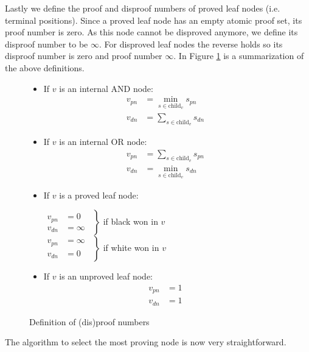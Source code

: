\documentclass[a4paper, 11pt]{article}
\begin{document}
Lastly we define the proof and disproof numbers of proved leaf nodes (i.e. terminal positions). Since a proved leaf node has an empty atomic proof set,
its proof number is zero. As this node cannot be disproved anymore, we define its disproof number to be $\infty$. For disproved leaf nodes the reverse holds
so its disproof number is zero and proof number $\infty$. In Figure \ref{pn:def} is a summarization of the above definitions.
\begin{figure}
\begin{itemize}
  \item If $v$ is an internal AND node:
    \begin{align*}
      v_{pn} &= \min_{s \in \text{child}_v} s_{pn}\\
      v_{dn} &= \sum_{s \in \text{child}_v} s_{dn}
    \end{align*}
  \item If $v$ is an internal OR node:
    \begin{align*}
      v_{pn} &= \sum_{s \in \text{child}_v} s_{pn}\\
      v_{dn} &= \min_{s \in \text{child}_v} s_{dn}
    \end{align*}
  \item If $v$ is a proved leaf node:
    \begin{center}
      $\left.
      \begin{aligned}
        v_{pn} &= 0 \quad \\
        v_{dn} &= \infty
      \end{aligned}
      \right\}$ if black won in $v$\\
      \hspace{0.7mm}$\left.
      \begin{aligned}
        v_{pn} &= \infty \\
        v_{dn} &= 0 \quad
      \end{aligned}
      \right\}$ if white won in $v$
    \end{center}
  \item If $v$ is an unproved leaf node:
    \begin{align*}
      v_{pn} &= 1 \\
      v_{dn} &= 1
    \end{align*}
\end{itemize}
\caption{Definition of (dis)proof numbers}
\label{pn:def}
\end{figure}

The algorithm to select the most proving node is now very straightforward.
\end{document}

